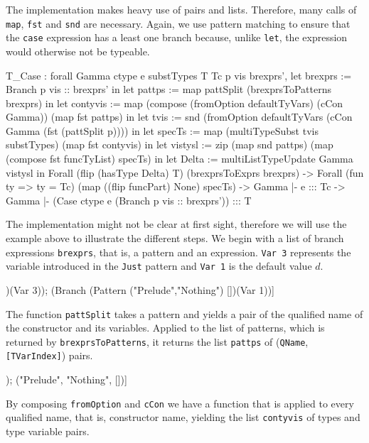 \documentclass[paper = a4, fleqn, abstract=on, twoside]{scrreprt}
\newcommand{\todo}[1]{\marginpar{\textbf{TODO:} #1}}
\newcommand{\coqinline}[1]{\texttt{#1}}
\begin{document}
The implementation makes heavy use of pairs and lists. Therefore, many calls of \coqinline{map}, \coqinline{fst} and \coqinline{snd} are necessary. Again, we use pattern matching to ensure that the \texttt{case} expression has a least one branch because, unlike \texttt{let}, the expression would otherwise not be typeable.
\todo{CamelCase im Code}
\begin{coqcode}
T_Case : forall Gamma ctype e substTypes T Tc p vis brexprs',
           let  brexprs := Branch p vis :: brexprs' in
           let   pattps := map pattSplit (brexprsToPatterns brexprs) in
           let contyvis := map (compose (fromOption defaultTyVars) (cCon Gamma))
                               (map fst pattps) in
           let     tvis := snd (fromOption defaultTyVars (cCon Gamma (fst (pattSplit p)))) in
           let   specTs := map (multiTypeSubst tvis substTypes)
                               (map fst contyvis) in
           let  vistysl := zip (map snd pattps)
                               (map (compose fst funcTyList) specTs) in
           let    Delta := multiListTypeUpdate Gamma vistysl
            in Forall (flip (hasType Delta) T) (brexprsToExprs brexprs) ->
               Forall (fun ty => ty = Tc) (map ((flip funcPart) None) specTs) ->
               Gamma |- e ::: Tc ->
         Gamma |- (Case ctype e (Branch p vis :: brexprs')) ::: T
\end{coqcode}
The implementation might not be clear at first sight, therefore we will use the example above to illustrate the different steps. We begin with a list of branch expressions \texttt{brexprs}, that is, a pattern and an expression. \texttt{Var 3} represents the variable introduced in the \texttt{Just} pattern and \texttt{Var 1} is the default value $d$.
\begin{coqcode}
[(Branch (Pattern ("Prelude","Just")   [3])(Var 3));
 (Branch (Pattern ("Prelude","Nothing") [])(Var 1))]
\end{coqcode}
The function \coqinline{pattSplit} takes a pattern and yields a pair of the qualified name of the constructor and its variables. Applied to the list of patterns, which is returned by \coqinline{brexprsToPatterns}, it returns the list \texttt{pattps} of (\coqinline{QName}, \coqinline{[TVarIndex]}) pairs.
\begin{coqcode}
[("Prelude", "Just", [3]); ("Prelude", "Nothing", [])]
\end{coqcode}
By composing \coqinline{fromOption} and \coqinline{cCon} we have a function that is applied to every qualified name, that is, constructor name, yielding the list \texttt{contyvis} of types and type variable pairs.
\end{document}
